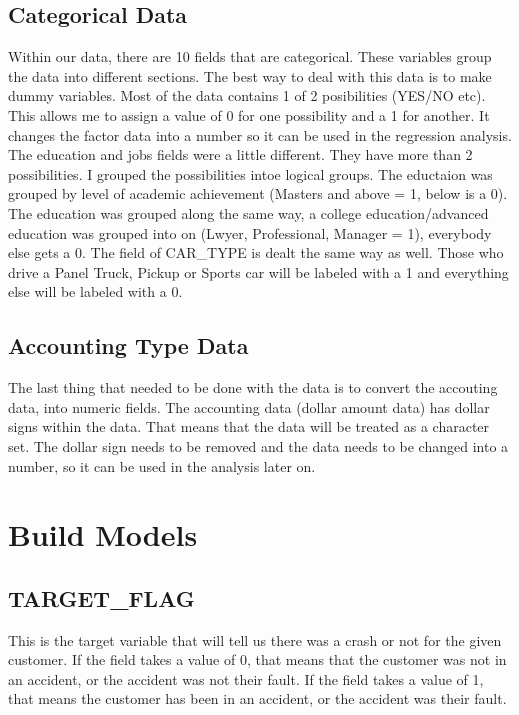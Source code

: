 \documentclass[]{article}
\begin{document}
\subsection{Categorical Data}\label{categorical-data}

Within our data, there are 10 fields that are categorical. These
variables group the data into different sections. The best way to deal
with this data is to make dummy variables. Most of the data contains 1
of 2 posibilities (YES/NO etc). This allows me to assign a value of 0
for one possibility and a 1 for another. It changes the factor data into
a number so it can be used in the regression analysis. The education and
jobs fields were a little different. They have more than 2
possibilities. I grouped the possibilities intoe logical groups. The
eductaion was grouped by level of academic achievement (Masters and
above = 1, below is a 0). The education was grouped along the same way,
a college education/advanced education was grouped into on (Lwyer,
Professional, Manager = 1), everybody else gets a 0. The field of
CAR\_TYPE is dealt the same way as well. Those who drive a Panel Truck,
Pickup or Sports car will be labeled with a 1 and everything else will
be labeled with a 0.

\subsection{Accounting Type Data}\label{accounting-type-data}

The last thing that needed to be done with the data is to convert the
accouting data, into numeric fields. The accounting data (dollar amount
data) has dollar signs within the data. That means that the data will be
treated as a character set. The dollar sign needs to be removed and the
data needs to be changed into a number, so it can be used in the
analysis later on.

\section{Build Models}\label{build-models}

\subsection{TARGET\_FLAG}\label{targetux5fflag}

This is the target variable that will tell us there was a crash or not
for the given customer. If the field takes a value of 0, that means that
the customer was not in an accident, or the accident was not their
fault. If the field takes a value of 1, that means the customer has been
in an accident, or the accident was their fault.
\end{document}
